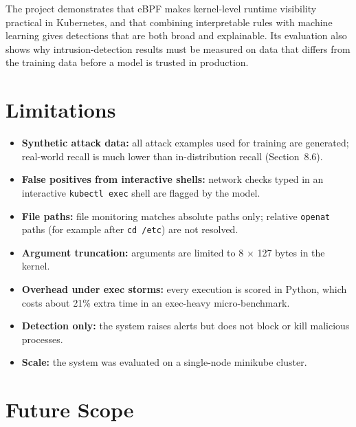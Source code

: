 The project demonstrates that eBPF makes kernel-level runtime visibility practical in
Kubernetes, and that combining interpretable rules with machine learning gives
detections that are both broad and explainable. Its evaluation also shows why
intrusion-detection results must be measured on data that differs from the training
data before a model is trusted in production.

\section{Limitations}

\begin{itemize}
    \item \textbf{Synthetic attack data:} all attack examples used for training are
          generated; real-world recall is much lower than in-distribution recall
          (Section~8.6).
    \item \textbf{False positives from interactive shells:} network checks typed in an
          interactive \texttt{kubectl exec} shell are flagged by the model.
    \item \textbf{File paths:} file monitoring matches absolute paths only; relative
          \texttt{openat} paths (for example after \texttt{cd /etc}) are not resolved.
    \item \textbf{Argument truncation:} arguments are limited to 8 $\times$ 127 bytes in the
          kernel.
    \item \textbf{Overhead under exec storms:} every execution is scored in Python, which
          costs about 21\% extra time in an exec-heavy micro-benchmark.
    \item \textbf{Detection only:} the system raises alerts but does not block or kill
          malicious processes.
    \item \textbf{Scale:} the system was evaluated on a single-node minikube cluster.
\end{itemize}

\section{Future Scope}

